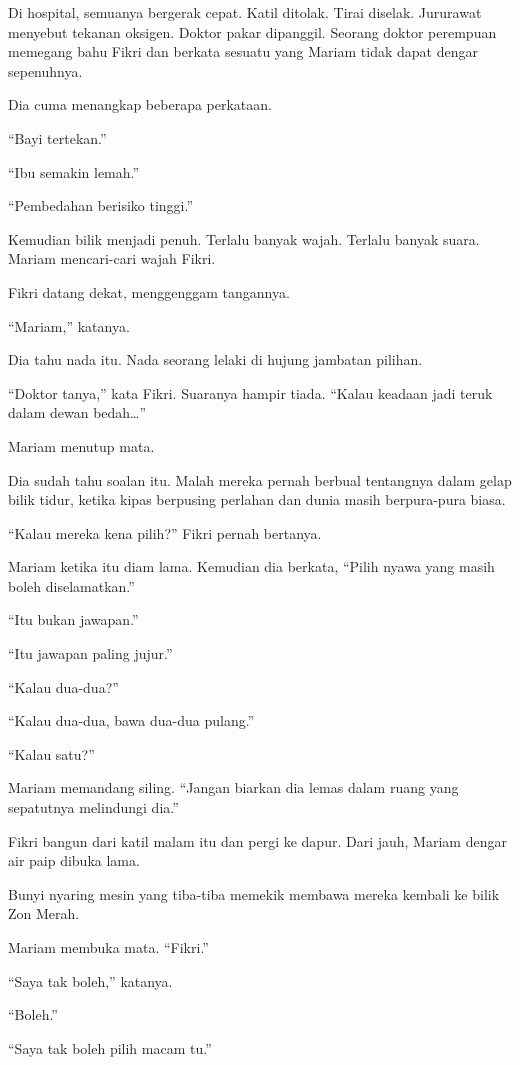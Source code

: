 \documentclass[
  11pt,
  a5paper,
  openany,
  oneside]{book}
\begin{document}
Di hospital, semuanya bergerak cepat. Katil ditolak. Tirai diselak.
Jururawat menyebut tekanan oksigen. Doktor pakar dipanggil. Seorang
doktor perempuan memegang bahu Fikri dan berkata sesuatu yang Mariam
tidak dapat dengar sepenuhnya.

Dia cuma menangkap beberapa perkataan.

``Bayi tertekan.''

``Ibu semakin lemah.''

``Pembedahan berisiko tinggi.''

Kemudian bilik menjadi penuh. Terlalu banyak wajah. Terlalu banyak
suara. Mariam mencari-cari wajah Fikri.

Fikri datang dekat, menggenggam tangannya.

``Mariam,'' katanya.

Dia tahu nada itu. Nada seorang lelaki di hujung jambatan pilihan.

``Doktor tanya,'' kata Fikri. Suaranya hampir tiada. ``Kalau keadaan
jadi teruk dalam dewan bedah\ldots''

Mariam menutup mata.

Dia sudah tahu soalan itu. Malah mereka pernah berbual tentangnya dalam
gelap bilik tidur, ketika kipas berpusing perlahan dan dunia masih
berpura-pura biasa.

``Kalau mereka kena pilih?'' Fikri pernah bertanya.

Mariam ketika itu diam lama. Kemudian dia berkata, ``Pilih nyawa yang
masih boleh diselamatkan.''

``Itu bukan jawapan.''

``Itu jawapan paling jujur.''

``Kalau dua-dua?''

``Kalau dua-dua, bawa dua-dua pulang.''

``Kalau satu?''

Mariam memandang siling. ``Jangan biarkan dia lemas dalam ruang yang
sepatutnya melindungi dia.''

Fikri bangun dari katil malam itu dan pergi ke dapur. Dari jauh, Mariam
dengar air paip dibuka lama.

Bunyi nyaring mesin yang tiba-tiba memekik membawa mereka kembali ke
bilik Zon Merah.

Mariam membuka mata. ``Fikri.''

``Saya tak boleh,'' katanya.

``Boleh.''

``Saya tak boleh pilih macam tu.''
\end{document}
